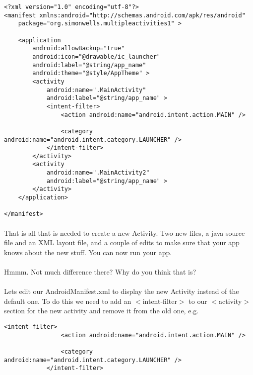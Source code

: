 \begin{lstlisting}
<?xml version="1.0" encoding="utf-8"?>
<manifest xmlns:android="http://schemas.android.com/apk/res/android"
    package="org.simonwells.multipleactivities1" >

    <application
        android:allowBackup="true"
        android:icon="@drawable/ic_launcher"
        android:label="@string/app_name"
        android:theme="@style/AppTheme" >
        <activity
            android:name=".MainActivity"
            android:label="@string/app_name" >
            <intent-filter>
                <action android:name="android.intent.action.MAIN" />

                <category android:name="android.intent.category.LAUNCHER" />
            </intent-filter>
        </activity>
        <activity
            android:name=".MainActivity2"
            android:label="@string/app_name" >
        </activity>
    </application>

</manifest>
\end{lstlisting}

\paragraph{} That is all that is needed to create a new Activity. Two new files, a java source file and an XML layout file, and a couple of edits to make sure that your app knows about the new stuff. You can now run your app.

\paragraph{} Hmmm. Not much difference there? Why do you think that is? 

\paragraph{} Lets edit our AndroidManifest.xml to display the new Activity instead of the default one. To do this we need to add an $<$intent-filter$>$ to our $<$activity$>$ section for the new activity and remove it from the old one, e.g.

\begin{lstlisting}
<intent-filter>
                <action android:name="android.intent.action.MAIN" />

                <category android:name="android.intent.category.LAUNCHER" />
            </intent-filter>
\end{lstlisting}

